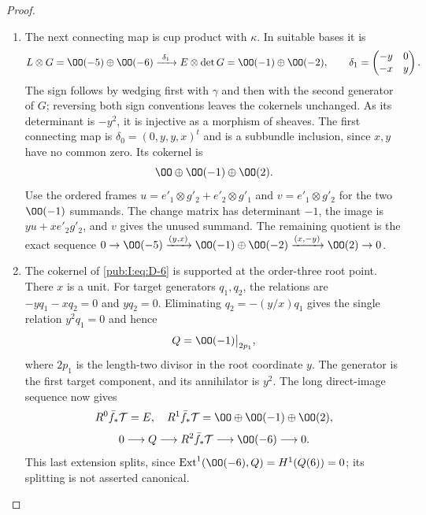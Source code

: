 \begin{proof}
\begin{enumerate}[label=\arabic*.,leftmargin=*]
\begin{enumerate}[label=(\alph*),leftmargin=*]
\item The next connecting map is cup product with $\kappa$. In suitable
bases it is
\begin{equation}
 L\otimes G=\OO(-5)\oplus\OO(-6)
 \xrightarrow{\ \delta_1\ }
 E\otimes\det G=\OO(-1)\oplus\OO(-2),\qquad
 \delta_1=\begin{pmatrix}-y&0\\-x&y\end{pmatrix}.
\label{pub:I:eq:D-6}
\end{equation}
The sign follows by wedging first with $\gamma$ and then with the
second generator of $G$; reversing both sign conventions leaves the
cokernels unchanged. As its determinant is $-y^2$, it is injective as
a morphism of sheaves. The first connecting map is
$\delta_0=(0,y,y,x)^t$ and is a subbundle inclusion, since $x,y$ have
no common zero. Its cokernel is
\begin{equation}
 \OO\oplus\OO(-1)\oplus\OO(2).
\label{pub:I:eq:D-7}
\end{equation}
Use the ordered frames
$u=e'_1\otimes g'_2+e'_2\otimes g'_1$ and
$v=e'_1\otimes g'_2$ for the two $\OO(-1)$ summands.
The change matrix has determinant $-1$, the image is $yu+xe'_2g'_2$,
and $v$ gives the unused summand. The remaining quotient is the exact sequence
$0\to\OO(-5)\xrightarrow{(y,x)}\OO(-1)\oplus\OO(-2)
\xrightarrow{(x,-y)}\OO(2)\to0$.

\item The cokernel of \eqref{pub:I:eq:D-6} is supported at the order-three root point. There $x$ is a unit. For target generators $q_1,q_2$, the
relations are $-yq_1-xq_2=0$ and $yq_2=0$. Eliminating
$q_2=-(y/x)q_1$ gives the single relation $y^2q_1=0$ and hence
\begin{equation}
 Q=\OO(-1)\big|_{2p_1},
\label{pub:I:eq:D-8}
\end{equation}
where $2p_1$ is the length-two divisor in the root coordinate $y$. The generator is the first target component,
and its annihilator is $y^2$. The long direct-image sequence now gives
\[
 R^0\bar f_*\mathcal T=E,\quad
 R^1\bar f_*\mathcal T=\OO\oplus\OO(-1)\oplus\OO(2),
\]
\begin{equation}
 0\longrightarrow Q\longrightarrow R^2\bar f_*\mathcal T
 \longrightarrow\OO(-6)\longrightarrow0.
\label{pub:I:eq:D-9}
\end{equation}
This last extension splits, since $\operatorname{Ext}^1(\OO(-6),Q)
=H^1(Q(6))=0$; its splitting is not asserted canonical.


\end{enumerate}
\end{enumerate}
\end{proof}
